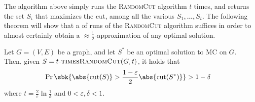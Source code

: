 \documentclass[a4paper, 12pt]{report}
\begin{document}
    The algorithm above simply runs the \textsc{RandomCut} algorithm $t$ times, and returns the set $S_i$ that maximizes the cut, among all the various $S_1, \ldots, S_t$. The following theorem will show that a  of runs of the \textsc{RandomCut} algorithm suffices in order to almost certainly obtain a $\approx \frac{1}{2}$-approximation of any optimal solution.

    \begin{framedthm}{}
        Let $G= (V, E)$ be a graph, and let $S^*$ be an optimal solution to MC on $G$. Then, given $S = \textsc{$t$-timesRandomCut}(G, t)$, it holds that $$\Pr \sbk{\abs{\mathrm{cut}(S)} > \dfrac{1 - \varepsilon}{2} \abs{\mathrm{cut}(S^*)}} > 1 - \delta$$ where $t = \frac{2}{\varepsilon} \ln {\frac{1}{\delta}}$ and $0 < \varepsilon, \delta < 1$.
    \end{framedthm}
    
\end{document}
